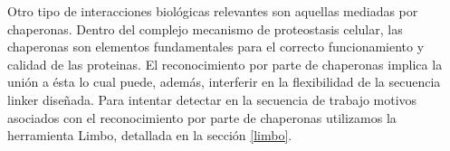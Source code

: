 Otro tipo de interacciones biológicas relevantes son aquellas mediadas por chaperonas.
Dentro del complejo mecanismo de proteostasis celular, las chaperonas son elementos fundamentales para el correcto funcionamiento y calidad de las proteinas.
El reconocimiento por parte de chaperonas implica la unión a ésta lo cual puede, además, interferir en la flexibilidad de la secuencia linker diseñada.
Para intentar detectar en la secuencia de trabajo motivos asociados con el reconocimiento por parte de chaperonas utilizamos la herramienta Limbo, detallada en la sección \ref{limbo}. 


% 























